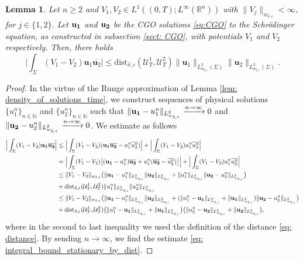 \documentclass[10pt,a4paper]{amsart}
\newtheorem{lemma}[proposition]{Lemma}
\theoremstyle{remark}
\theoremstyle{definition}
\newcommand{\R}{\mathbb{R}}
\newcommand{\N}{\mathbb{N}}
\newcommand{\dist}{\mathrm{dist}}
\def\ve{\varepsilon}
\def\cal{\mathcal}
\def\ovl{\overline}
\begin{document}
\begin{lemma}\label{lem: bound_integral_CGO_by_distance}
Let $n\geq2$ and $V_1, V_2\in L^1((0, T); L^\infty(\R^n))$ with $\|V_j\|_{w_{\delta,\ve} }< \infty$, for $j\in \{1, 2\}$. Let ${\bf u_1}$ and ${\bf u_2}$ be the CGO solutions \eqref{eq:CGO} to the Schr\"odinger equation, as constructed in subsection \ref{sect: CGO}, with potentials $V_1$ and $V_2$ respectively. Then, there holds 
%
\begin{equation}\label{eq: integral_bound_CGO_by_dist}
%
\Big| \int_\Sigma (V_1-V_2) \mathbf{u}_1 \ovl{\mathbf{u}_2} \Big| 
\leq  
\dist_{\delta, \ve} (\cal{U}_T^1, \cal{U}_T^2) \| \mathbf{u}_1 \|_{L^2_{w_{\delta, \ve}}(\Sigma)} \| \mathbf{u}_2 \|_{L^2_{w_{\delta, \ve}}(\Sigma)}. 
%
\end{equation}
%
\end{lemma}

\begin{proof}
In the virtue of the Runge approximation of Lemma \ref{lem: density_of_solutions_time}, we construct sequences of physical solutions $\{u_1^n\}_{n\in\N}$ and $\{u_2^n\}_{n\in\N}$ such that $\| {\bf u_1} -u^n_1\|_{L^2_{w_{\delta, \ve}}}\xrightarrow{n\to\infty}0$ and $\| {\bf u_2} -u_2^n\|_{L^2_{w_{\delta, \ve}}} \xrightarrow{n\to\infty}0$. We estimate as follows
%
\begin{align*}
%
\Big| \int_\Sigma (V_1 - V_2) {\bf u_1} \ovl{ {\bf u_2}} \Big| &\leq \Big| \int_\Sigma (V_1-V_2)({\bf u_1} \ovl{{\bf u_2}} - u^{n}_1\ovl{u^{n}_2}) \Big|
+ \Big| \int_\Sigma (V_1 - V_2) u^{n}_1 \ovl{u^{n}_2} \Big| \\
%
&= \Big| \int_\Sigma (V_1-V_2)\big[({\bf u_1} - u^{n}_1)\ovl{{\bf u_2}} + u^{n}_1(\ovl{{\bf u_2}}-\ovl{u^{n}_2}) \big] \Big| 
+ \Big| \int_\Sigma (V_1-V_2) u^{n}_1 \ovl{u^{n}_2} \Big| \\
%
&\leq \| V_1-V_2 \|_{w_{\delta, \ve}} \big( \| {\bf u_1} - u^{n}_1\|_{L^2_{w_{\delta, \ve}}} \| {\bf u_2} \|_{L^2_{w_{\delta, \ve}}} + \|u^{n}_1\|_{L^2_{w_{\delta, \ve}}}\|{\bf u_2} - u^{n}_2 \|_{L^2_{w_{\delta, \ve}}} \big) \\
%
&+ \dist_{\delta, \ve}(\cal{U}_T^1, \cal{U}_T^2) \|u^n_1\|_{L^2_{w_{\delta, \ve}}} \|u^n_2\|_{L^2_{w_{\delta, \ve}}} \\
%
&\leq \| V_1-V_2 \|_{w_{\delta, \ve}} \big( \| {\bf u_1} - u^n_1\|_{L^2_{w_{\delta, \ve}}} \|{\bf u_2}\|_{L^2_{w_{\delta, \ve}}} + ( \|u^n_1- {\bf u_1}\|_{L^2_{w_{\delta, \ve}}} + \| {\bf u_1} \|_{L^2_{w_{\delta, \ve}}})\|{\bf u_2} - u^n_2 \|_{L^2_{w_{\delta, \ve}}} \big) \\
%
&+  \dist_{\delta, \ve}(\cal{U}_T^1, \cal{U}_T^2) \big( \|u^n_1- {\bf u_1}\|_{L^2_{w_{\delta, \ve}}} + \|{\bf u_1}\|_{L^2_{w_{\delta, \ve}}} \big) 
\big(\|u^n_2 - {\bf u_2}\|_{L^2_{w_{\delta, \ve}}} + \|{\bf u_2}\|_{L^2_{w_{\delta, \ve}}} \big),
%
\end{align*}
%
where in the second to last inequality we used the definition of the distance \eqref{eq: distance}. By sending $n\to\infty$, we find the estimate \eqref{eq: integral_bound_stationary_by_dist}.
\end{proof}
\end{document}
